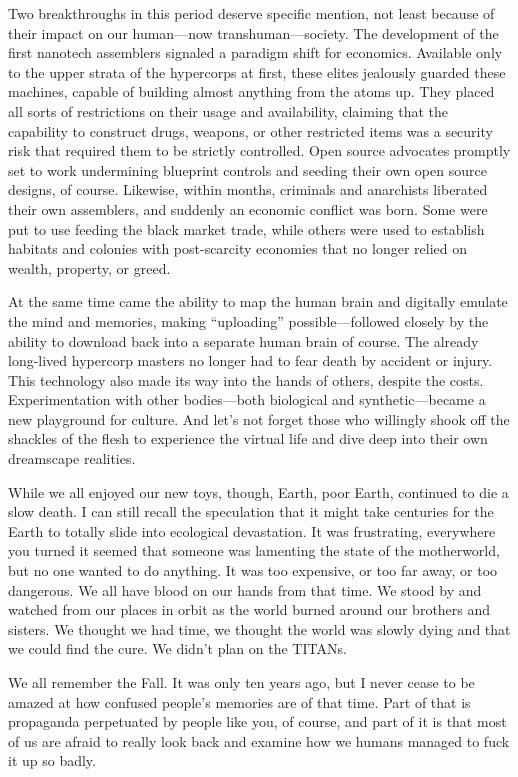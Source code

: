 Two breakthroughs in this period deserve specific mention, not least because of their impact on our human—now transhuman—society. The development of the first nanotech assemblers signaled a paradigm shift for economics. Available only to the upper strata of the hypercorps at first, these elites jealously guarded these machines, capable of building almost anything from the atoms up. They placed all sorts of restrictions on their usage and availability, claiming that the capability to construct drugs, weapons, or other restricted items was a security risk that required them to be strictly controlled. Open source advocates promptly set to work undermining blueprint controls and seeding their own open source designs, of course. Likewise, within months, criminals and anarchists liberated their own assemblers, and suddenly an economic conflict was born. Some were put to use feeding the black market trade, while others were used to establish habitats and colonies with post-scarcity economies that no longer relied on wealth, property, or greed. 

At the same time came the ability to map the human brain and digitally emulate the mind and memories, making “uploading” possible—followed closely by the ability to download back into a separate human brain of course. The already long-lived hypercorp masters no longer had to fear death by accident or injury. This technology also made its way into the hands of others, despite the costs. Experimentation with other bodies—both biological and synthetic—became a new playground for culture. And let's not forget those who willingly shook off the shackles of the flesh to experience the virtual life and dive deep into their own dreamscape realities. 

While we all enjoyed our new toys, though, Earth, poor Earth, continued to die a slow death. I can still recall the speculation that it might take centuries for the Earth to totally slide into ecological devastation. It was frustrating, everywhere you turned it seemed that someone was lamenting the state of the motherworld, but no one wanted to do anything. It was too expensive, or too far away, or too dangerous. We all have blood on our hands from that time. We stood by and watched from our places in orbit as the world burned around our brothers and sisters. We thought we had time, we thought the world was slowly dying and that we could find the cure. We didn't plan on the TITANs. 

We all remember the Fall. It was only ten years ago, but I never cease to be amazed at how confused people's memories are of that time. Part of that is propaganda perpetuated by people like you, of course, and part of it is that most of us are afraid to really look back and examine how we humans managed to fuck it up so badly. 

